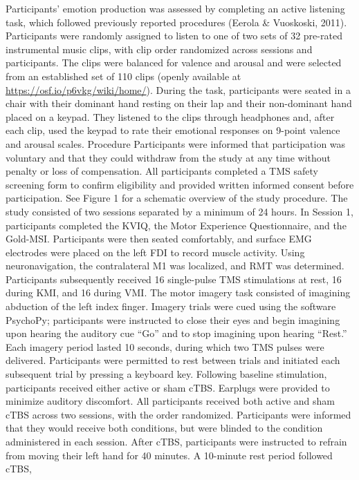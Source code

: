 \documentclass[
]{article}
\begin{document}
Participants' emotion production was assessed by completing an active
listening task, which followed previously reported procedures (Eerola \&
Vuoskoski, 2011). Participants were randomly assigned to listen to one
of two sets of 32 pre-rated instrumental music clips, with clip order
randomized across sessions and participants. The clips were balanced for
valence and arousal and were selected from an established set of 110
clips (openly available at \url{https://osf.io/p6vkg/wiki/home/}).
During the task, participants were seated in a chair with their dominant
hand resting on their lap and their non-dominant hand placed on a
keypad. They listened to the clips through headphones and, after each
clip, used the keypad to rate their emotional responses on 9-point
valence and arousal scales. Procedure Participants were informed that
participation was voluntary and that they could withdraw from the study
at any time without penalty or loss of compensation. All participants
completed a TMS safety screening form to confirm eligibility and
provided written informed consent before participation. See Figure 1 for
a schematic overview of the study procedure. The study consisted of two
sessions separated by a minimum of 24 hours. In Session 1, participants
completed the KVIQ, the Motor Experience Questionnaire, and the
Gold-MSI. Participants were then seated comfortably, and surface EMG
electrodes were placed on the left FDI to record muscle activity. Using
neuronavigation, the contralateral M1 was localized, and RMT was
determined. Participants subsequently received 16 single-pulse TMS
stimulations at rest, 16 during KMI, and 16 during VMI. The motor
imagery task consisted of imagining abduction of the left index finger.
Imagery trials were cued using the software PsychoPy; participants were
instructed to close their eyes and begin imagining upon hearing the
auditory cue ``Go'' and to stop imagining upon hearing ``Rest.'' Each
imagery period lasted 10 seconds, during which two TMS pulses were
delivered. Participants were permitted to rest between trials and
initiated each subsequent trial by pressing a keyboard key. Following
baseline stimulation, participants received either active or sham cTBS.
Earplugs were provided to minimize auditory discomfort. All participants
received both active and sham cTBS across two sessions, with the order
randomized. Participants were informed that they would receive both
conditions, but were blinded to the condition administered in each
session. After cTBS, participants were instructed to refrain from moving
their left hand for 40 minutes. A 10-minute rest period followed cTBS,
\end{document}

